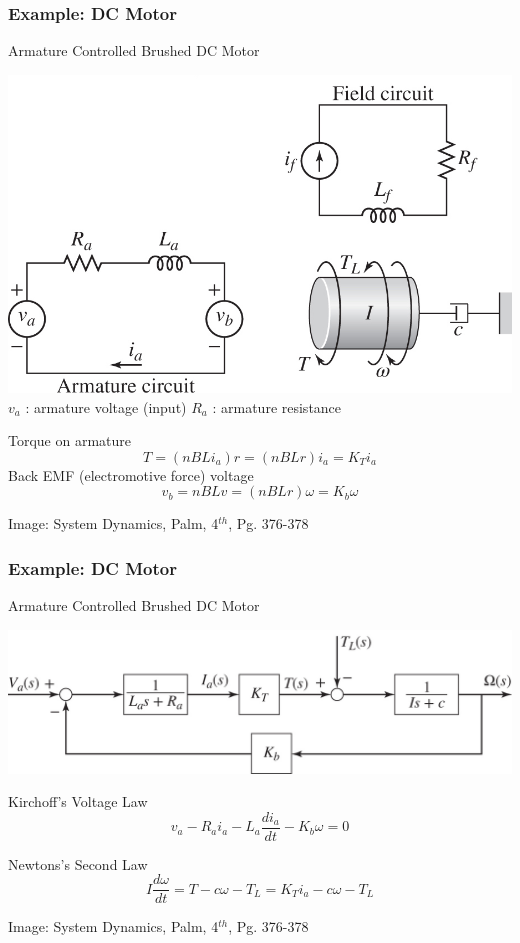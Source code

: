 \documentclass{beamer}                  %
\newcommand{\sectiontitleII}{Example: DC Motor}
\begin{document}
	\begin{frame}[label=sectionII,containsverbatim] \small
        \frametitle{\sectiontitleII}
		Armature Controlled Brushed DC Motor \vspc

		\begin{multicols}{2}

		\includegraphics[scale=.70]{paL40056_06_05_04_cropped.png}\vspace{5mm}\\


		\small
		$v_a$ : armature voltage (input)\vspc
        $R_a$ : armature resistance

        Torque on armature
        \[T=\left(nBLi_a \right)r=\left(nBLr\right)i_a=K_Ti_a \] 
        Back EMF (electromotive force) voltage
        \[v_b=nBLv=\left(nBLr\right)\omega=K_b\omega \]	

        \end{multicols}

		\btVFill
		\tiny{Image: System Dynamics, Palm, 4$^{th}$, Pg. 376-378}
		
	\end{frame}

	\begin{frame}[label=sectionII,containsverbatim] \small
        \frametitle{\sectiontitleII}
		Armature Controlled Brushed DC Motor \vspc

		\includegraphics[scale=.65]{paL40056_06_05_05_cropped.png}

        Kirchoff's Voltage Law 
        \[ v_a-R_ai_a-L_a\frac{di_a}{dt}-K_b\omega=0 \] 

        Newtons's Second Law  
        \[ I\frac{d\omega}{dt}=T-c\omega-T_L=K_Ti_a-c\omega-T_L \]	

		\btVFill
		\tiny{Image: System Dynamics, Palm, 4$^{th}$, Pg. 376-378}
		
	\end{frame}	
\end{document}
